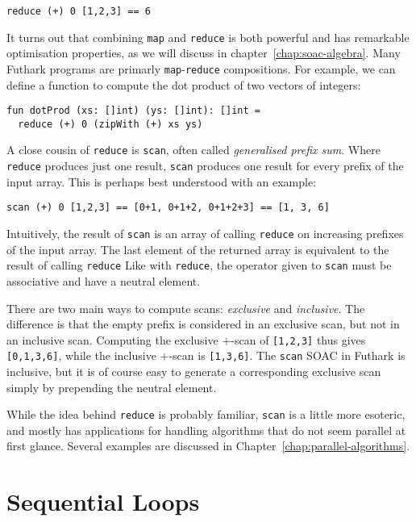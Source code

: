 \documentclass[oneside,11pt]{book}
\begin{document}
\begin{lstlisting}
reduce (+) 0 [1,2,3] == 6
\end{lstlisting}

It turns out that combining \texttt{map} and \texttt{reduce} is both
powerful and has remarkable optimisation properties, as we will
discuss in chapter~\ref{chap:soac-algebra}.  Many Futhark programs are
primarly \texttt{map}-\texttt{reduce} compositions.  For example, we
can define a function to compute the dot product of two vectors of
integers:

\begin{lstlisting}
fun dotProd (xs: []int) (ys: []int): []int =
  reduce (+) 0 (zipWith (+) xs ys)
\end{lstlisting}

A close cousin of \texttt{reduce} is \texttt{scan}, often called
\textit{generalised prefix sum}.  Where \texttt{reduce} produces just
one result, \texttt{scan} produces one result for every prefix of the
input array.  This is perhaps best understood with an example:

\begin{lstlisting}
scan (+) 0 [1,2,3] == [0+1, 0+1+2, 0+1+2+3] == [1, 3, 6]
\end{lstlisting}

Intuitively, the result of \texttt{scan} is an array of calling
\texttt{reduce} on increasing prefixes of the input array.  The last
element of the returned array is equivalent to the result of calling
\texttt{reduce} Like with \texttt{reduce}, the operator given to
\texttt{scan} must be associative and have a neutral element.

There are two main ways to compute scans: \textit{exclusive} and
\textit{inclusive}.  The difference is that the empty prefix is
considered in an exclusive scan, but not in an inclusive scan.
Computing the exclusive $+$-scan of \texttt{[1,2,3]} thus gives
\texttt{[0,1,3,6]}, while the inclusive $+$-scan is \texttt{[1,3,6]}.
The \texttt{scan} SOAC in Futhark is inclusive, but it is of course
easy to generate a corresponding exclusive scan simply by prepending
the neutral element.

While the idea behind \texttt{reduce} is probably familiar,
\texttt{scan} is a little more esoteric, and mostly has applications
for handling algorithms that do not seem parallel at first glance.
Several examples are discussed in
Chapter~\ref{chap:parallel-algorithms}.

\section{Sequential Loops}
\label{sec:sequential-loops}
\end{document}
